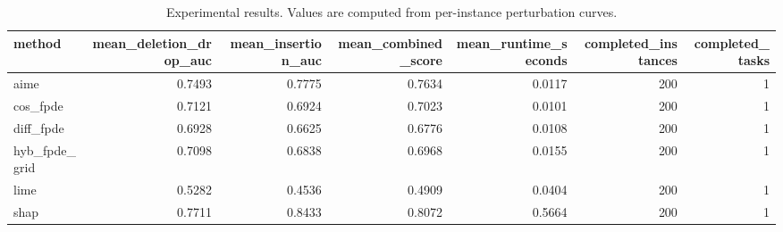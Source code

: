 \begin{table}[t]
\caption{Experimental results. Values are computed from per-instance perturbation curves.}
\label{tab:main_results_computed}
\centering
\begin{tabular}{lrrrrrr}
\toprule
method & mean\_deletion\_drop\_auc & mean\_insertion\_auc & mean\_combined\_score & mean\_runtime\_seconds & completed\_instances & completed\_tasks \\
\midrule
aime & 0.7493 & 0.7775 & 0.7634 & 0.0117 & 200 & 1 \\
cos\_fpde & 0.7121 & 0.6924 & 0.7023 & 0.0101 & 200 & 1 \\
diff\_fpde & 0.6928 & 0.6625 & 0.6776 & 0.0108 & 200 & 1 \\
hyb\_fpde\_grid & 0.7098 & 0.6838 & 0.6968 & 0.0155 & 200 & 1 \\
lime & 0.5282 & 0.4536 & 0.4909 & 0.0404 & 200 & 1 \\
shap & 0.7711 & 0.8433 & 0.8072 & 0.5664 & 200 & 1 \\
\bottomrule
\end{tabular}

\end{table}
